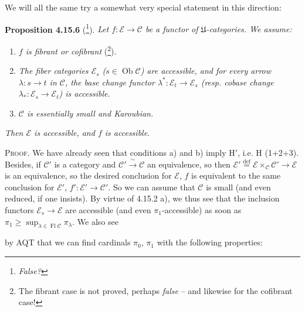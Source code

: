 \documentclass[11pt]{article}
\newcommand{\msp}[1]{\marginpar{\footnotesize [#1]}}
\newcommand{\cE}{\mathcal{E}}
\newcommand{\cC}{\mathcal{C}}
\newcommand{\Ob}{\operatorname{Ob}}
\newcommand{\Fl}{\operatorname{Fl}}
\begin{document}
We will all the same try a somewhat very special statement in this direction:

\msp{page 435}\textbf{Proposition 4.15.6} (\footnote[180]{\textit{False?}}). \textit{Let $f : \cE \longrightarrow \cC$ be a functor of $\mathfrak{U}$-categories. We assume:}
\begin{enumerate}
\item[\textit{a)}] \textit{$f$ is fibrant or cofibrant} (\footnote[181]{The fibrant case is not proved, perhaps \textit{false} -- and likewise for the cofibrant case!}).
\item[\textit{b)}] \textit{The fiber categories $\cE_s$ ($s \in \Ob \cC$) are accessible, and for every arrow $\lambda : s \longrightarrow t$ in $\cC$, the base change functor $\lambda^* : \cE_t \longrightarrow \cE_s$ (resp. cobase change $\lambda_* : \cE_s \longrightarrow \cE_t$) is accessible.}
\item[\textit{c)}] \textit{$\cC$ is essentially small and Karoubian.}
\end{enumerate}
\textit{Then $\cE$ is accessible, and $f$ is accessible.}

\textsc{Proof}. We have already seen that conditions a) and b) imply $\mathrm{H}'$, i.e. H (1+2+3). Besides, if $\cC'$ is a category and $\cC' \xrightarrow{\ \sim\ } \cC$ an equivalence, so then $\cE' \overset{\text{def}}{=} \cE \times_{\cC} \cC' \longrightarrow \cE$ is an equivalence, so the desired conclusion for $\cE$, $f$ is equivalent to the same conclusion for $\cE'$, $f' : \cE' \longrightarrow \cC'$. So we can assume that $\cC$ is small (and even reduced, if one insists). By virtue of 4.15.2 a), we thus see that the inclusion functors $\cE_s \longrightarrow \cE$ are accessible (and even $\pi_1$-accessible) as soon as $\pi_1 \geqslant \sup_{\lambda \in \Fl \cC} \pi_{\lambda}$. We also see

\msp{page 436}by AQT that we can find cardinals $\pi_0$, $\pi_1$ with the following properties:
\end{document}
